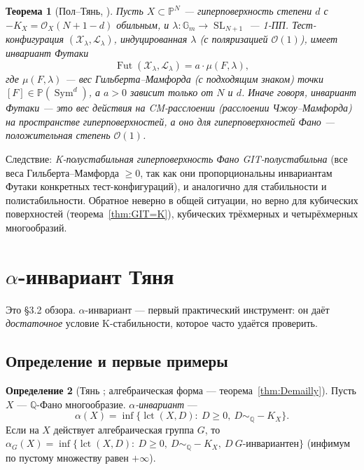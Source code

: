 \documentclass[11pt,a4paper]{article}
\theoremstyle{plain}
\newtheorem{theorem}{Теорема}[section]
\theoremstyle{definition}
\newtheorem{definition}[theorem]{Определение}
\theoremstyle{remark}
\newcommand{\Q}{\mathbb{Q}}
\newcommand{\PP}{\mathbb{P}}
\newcommand{\Gm}{\mathbb{G}_m}
\newcommand{\cO}{\mathcal{O}}
\newcommand{\cL}{\mathcal{L}}
\newcommand{\cX}{\mathcal{X}}
\DeclareMathOperator{\SL}{SL}
\DeclareMathOperator{\Sym}{Sym}
\DeclareMathOperator{\Fut}{Fut}
\DeclareMathOperator{\lct}{lct}
\begin{document}
\begin{theorem}[{Пол--Тянь, \cite{PT}}]\label{thm:PT}
Пусть $X\subset\PP^N$ --- гиперповерхность степени $d$ с $-K_X=\cO_X(N+1-d)$ обильным, и
$\lambda\colon\Gm\to\SL_{N+1}$ --- 1-ПП. Тест-конфигурация $(\cX_\lambda,\cL_\lambda)$, индуцированная
$\lambda$ \textup{(}с поляризацией $\cO(1)$\textup{)}, имеет инвариант Футаки
\[
\Fut(\cX_\lambda,\cL_\lambda)=a\cdot\mu(F,\lambda),
\]
где $\mu(F,\lambda)$ --- вес Гильберта--Мамфорда \textup{(}с подходящим знаком\textup{)} точки $[F]\in\PP(\Sym^d)$,
а $a>0$ зависит только от $N$ и $d$. Иначе говоря, инвариант Футаки --- это вес действия
на \emph{CM-расслоении} \textup{(}расслоении Чжоу--Мамфорда\textup{)} на пространстве гиперповерхностей, а оно
для гиперповерхностей Фано --- положительная степень $\cO(1)$.
\end{theorem}

Следствие: \emph{K-полустабильная гиперповерхность Фано GIT-полустабильна} (все веса
Гильберта--Мамфорда $\ge0$, так как они пропорциональны инвариантам Футаки конкретных
тест-конфигураций), и аналогично для стабильности и полистабильности. Обратное неверно в общей
ситуации, но верно для кубических поверхностей (теорема~\ref{thm:GIT=K}), кубических трёхмерных и
четырёхмерных многообразий.

\section{\texorpdfstring{$\alpha$}{α}-инвариант Тяня}\label{sec:alpha}

Это \S3.2 обзора. $\alpha$-инвариант --- первый практический инструмент: он даёт \emph{достаточное}
условие K-стабильности, которое часто удаётся проверить.

\subsection{Определение и первые примеры}

\begin{definition}[{Тянь \cite{Tia87}; алгебраическая форма --- теорема~\ref{thm:Demailly}}]\label{def:alpha}
Пусть $X$ --- $\Q$-Фано многообразие. \emph{$\alpha$-инвариант} ---
\[
\alpha(X)=\inf\{\lct(X,D):\ D\ge0,\ D\sim_\Q-K_X\}.
\]
Если на $X$ действует алгебраическая группа $G$, то
$\alpha_G(X)=\inf\{\lct(X,D):\ D\ge0,\ D\sim_\Q-K_X,\ D\ \text{$G$-инвариантен}\}$ (инфимум по
пустому множеству равен $+\infty$).
\end{definition}
\end{document}
